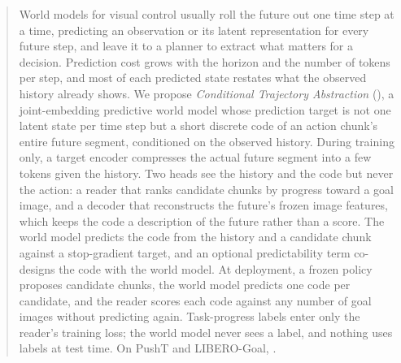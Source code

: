 \begin{abstract}
World models for visual control usually roll the future out one time step at a time, predicting an observation or its latent representation for every future step, and leave it to a planner to extract what matters for a decision.
Prediction cost grows with the horizon and the number of tokens per step, and most of each predicted state restates what the observed history already shows.
We propose \emph{Conditional Trajectory Abstraction} (\method), a joint-embedding predictive world model whose prediction target is not one latent state per time step but a short discrete code of an action chunk's entire future segment, conditioned on the observed history.
During training only, a target encoder compresses the actual future segment into a few tokens given the history.
Two heads see the history and the code but never the action: a reader that ranks candidate chunks by progress toward a goal image, and a decoder that reconstructs the future's frozen image features, which keeps the code a description of the future rather than a score.
The world model predicts the code from the history and a candidate chunk against a stop-gradient target, and an optional predictability term co-designs the code with the world model.
At deployment, a frozen policy proposes candidate chunks, the world model predicts one code per candidate, and the reader scores each code against any number of goal images without predicting again.
Task-progress labels enter only the reader's training loss; the world model never sees a label, and nothing uses labels at test time.
On PushT and LIBERO-Goal, \method{} .
\end{abstract}

